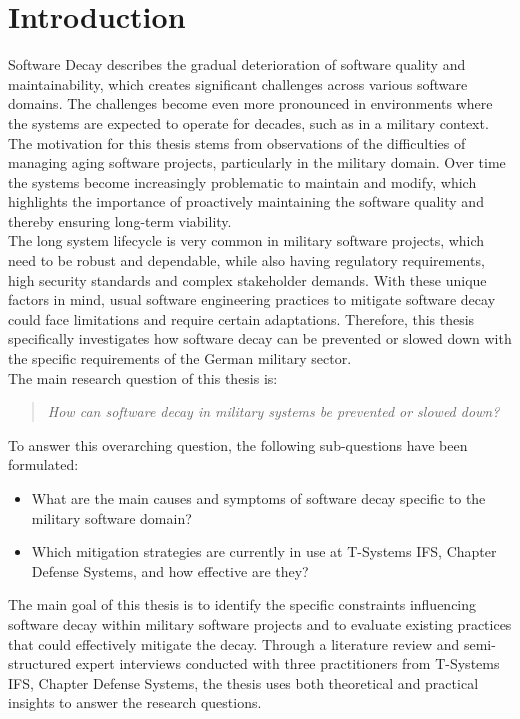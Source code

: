 \section{Introduction}
Software Decay describes the gradual deterioration of software quality and maintainability, which creates significant challenges across various software domains.
The challenges become even more pronounced in environments where the systems are expected to operate for decades, such as in a military context.
The motivation for this thesis stems from observations of the difficulties of managing aging software projects, particularly in the military domain.
Over time the systems become increasingly problematic to maintain and modify, which highlights the importance of proactively maintaining the software quality and thereby ensuring long-term viability.\\
The long system lifecycle is very common in military software projects, which need to be robust and dependable, while also having regulatory requirements,
high security standards and complex stakeholder demands. With these unique factors in mind, usual software engineering practices to mitigate software decay 
could face limitations and require certain adaptations. Therefore, this thesis specifically investigates how software decay can be prevented or slowed down
with the specific requirements of the German military sector.\\
The main research question of this thesis is:
\begin{quote}
    \textit{How can software decay in military systems be prevented or slowed down?}
\end{quote}
To answer this overarching question, the following sub-questions have been formulated:
\begin{itemize}
    \item What are the main causes and symptoms of software decay specific to the military software domain?
    \item Which mitigation strategies are currently in use at T-Systems IFS, Chapter Defense Systems, and how effective are they?
\end{itemize}
The main goal of this thesis is to identify the specific constraints influencing software decay within military software projects and to evaluate existing practices that could effectively mitigate the decay.
Through a literature review and semi-structured expert interviews conducted with three practitioners from T-Systems IFS, Chapter Defense Systems, the thesis uses both theoretical and practical insights to answer the research questions.\\


